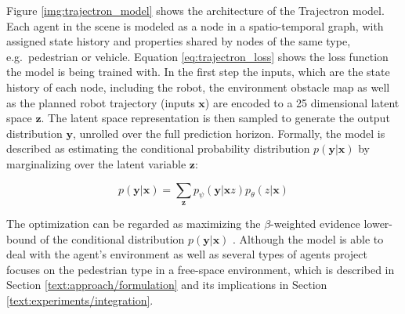 Figure \ref{img:trajectron_model} shows the architecture of the Trajectron model. Each agent in the scene is modeled as a node in a spatio-temporal graph, with assigned state history and properties shared by nodes of the same type, e.g.\ pedestrian or vehicle. Equation \ref{eq:trajectron_loss} shows the loss function the model is being trained with. In the first step the inputs, which are the state history of each node, including the robot, the environment obstacle map as well as the planned robot trajectory (inputs $\boldsymbol{x}$) are encoded to a 25 dimensional latent space $\boldsymbol{z}$. The latent space representation is then sampled to generate the output distribution $\boldsymbol{y}$, unrolled over the full prediction horizon. Formally, the model is described as estimating the conditional probability distribution $p(\boldsymbol{y}|\boldsymbol{x})$ by marginalizing over the latent variable $\boldsymbol{z}$:

\begin{equation}
p(\boldsymbol{y}|\boldsymbol{x}) = \sum_{\boldsymbol{z}} p_{\psi} (\boldsymbol{y} | \boldsymbol{x} z) p_{\theta}(z | \boldsymbol{x})
\end{equation}

The optimization can be regarded as maximizing the $\beta$-weighted evidence lower-bound of the conditional distribution $p(\boldsymbol{y}|\boldsymbol{x})$ \cite{Ivanovic2018}. Although the model is able to deal with the agent's environment as well as several types of agents project \project focuses on the pedestrian type in a free-space environment, which is described in Section \ref{text:approach/formulation} and its implications in Section \ref{text:experiments/integration}.

